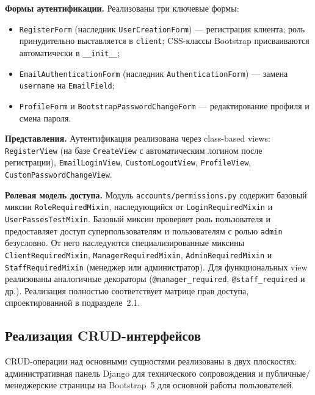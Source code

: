 \textbf{Формы аутентификации.} Реализованы три ключевые формы:
\begin{itemize}
    \item \texttt{RegisterForm} (наследник \texttt{UserCreationForm}) --- регистрация клиента; роль принудительно выставляется в \texttt{client}; CSS-классы Bootstrap присваиваются автоматически в \texttt{\_\_init\_\_};
    \item \texttt{EmailAuthenticationForm} (наследник \texttt{AuthenticationForm}) --- замена \texttt{username} на \texttt{EmailField};
    \item \texttt{ProfileForm} и \texttt{BootstrapPasswordChangeForm} --- редактирование профиля и смена пароля.
\end{itemize}

\textbf{Представления.} Аутентификация реализована через class-based views: \texttt{RegisterView} (на базе \texttt{CreateView} с автоматическим логином после регистрации), \texttt{EmailLoginView}, \texttt{CustomLogoutView}, \texttt{ProfileView}, \texttt{CustomPasswordChangeView}.

\textbf{Ролевая модель доступа.} Модуль \texttt{accounts/permissions.py} содержит базовый миксин \texttt{RoleRequiredMixin}, наследующийся от \texttt{LoginRequiredMixin} и \texttt{UserPassesTestMixin}. Базовый миксин проверяет роль пользователя и предоставляет доступ суперпользователям и пользователям с ролью \texttt{admin} безусловно. От него наследуются специализированные миксины \texttt{ClientRequiredMixin}, \texttt{ManagerRequiredMixin}, \texttt{AdminRequiredMixin} и \texttt{StaffRequiredMixin} (менеджер или администратор). Для функциональных view реализованы аналогичные декораторы (\texttt{@manager\_required}, \texttt{@staff\_required} и др.). Реализация полностью соответствует матрице прав доступа, спроектированной в подразделе~2.1.

\subsection{Реализация CRUD-интерфейсов}

CRUD-операции над основными сущностями реализованы в двух плоскостях: административная панель Django для технического сопровождения и публичные/менеджерские страницы на Bootstrap~5 для основной работы пользователей.

